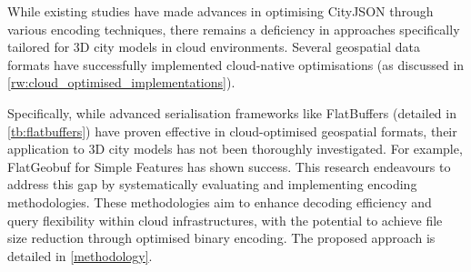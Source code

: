While existing studies have made advances in optimising CityJSON through various encoding techniques, there remains a deficiency in approaches specifically tailored for 3D city models in cloud environments.
Several geospatial data formats have successfully implemented cloud-native optimisations (as discussed in \autoref{rw:cloud_optimised_implementations}).

Specifically, while advanced serialisation frameworks like FlatBuffers (detailed in \autoref{tb:flatbuffers}) have proven effective in cloud-optimised geospatial formats, their application to 3D city models has not been thoroughly investigated.
For example, FlatGeobuf for Simple Features \citep{flatgeobuf} has shown success.
This research endeavours to address this gap by systematically evaluating and implementing encoding methodologies. These methodologies aim to enhance decoding efficiency and query flexibility within cloud infrastructures, with the potential to achieve file size reduction through optimised binary encoding. The proposed approach is detailed in \autoref{methodology}.